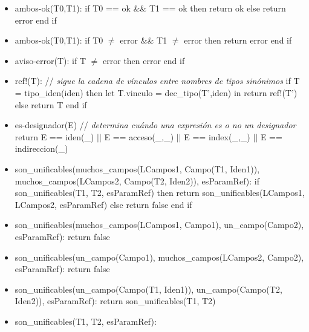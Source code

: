 \documentclass[11pt]{article}
\begin{document}
        \begin{itemize}
            \item ambos-ok(T0,T1): 
                \subitem if T0 == ok \&\&  T1 == ok then
                    \subsubitem return ok
                \subitem else
                    \subsubitem return error
                \subitem end if
            \item ambos-ok(T0,T1):
                \subitem if T0 $\neq$ error \&\&  T1 $\neq$ error then
                    \subsubitem return error 
                \subitem end if 
            \item aviso-error(T):
                \subitem if T $\neq$ error then
                    \subsubitem error 
                \subitem end if
            \item ref!(T): \/// \textit{sigue la cadena de vínculos entre nombres de tipos sinónimos}
                \subitem if T = tipo\_iden(iden) then
                    \subsubitem let T.vinculo = dec\_tipo(T',iden) in 
                        \subsubitem \hspace{2em} return ref!(T')
                \subitem else
                    \subsubitem return T
                \subitem end if
            \item es-designador(E) \/// \textit{determina cuándo una expresión es o no un designador}
                \subitem return E == iden(\_) $\vert \vert$ E == acceso(\_,\_) $\vert \vert$ E == index(\_,\_) $\vert \vert$ E == indireccion(\_)
            \item son\_unificables(muchos\_campos(LCampos1, Campo(T1, Iden1)), muchos\_campos(LCampos2, Campo(T2, Iden2)), esParamRef):
                \subitem if son\_unificables(T1, T2, esParamRef) then
                    \subsubitem return son\_unificables(LCampos1, LCampos2, esParamRef)
                \subitem else
                    \subsubitem return false
                \subitem end if
            \item son\_unificables(muchos\_campos(LCampos1, Campo1), un\_campo(Campo2), esParamRef):
                \subitem return false
            \item son\_unificables(un\_campo(Campo1), muchos\_campos(LCampos2, Campo2), esParamRef):
                \subitem return false
            \item son\_unificables(un\_campo(Campo(T1, Iden1)), un\_campo(Campo(T2, Iden2)), esParamRef): 
                \subitem return son\_unificables(T1, T2)
            \item son\_unificables(T1, T2, esParamRef): 

\end{itemize}
\end{document}
